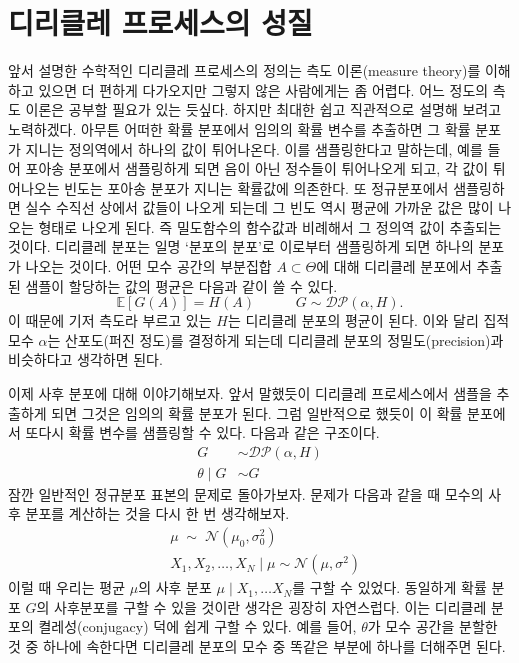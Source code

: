 \documentclass[a4paper, 10pt]{book}
\begin{document}
\section{디리클레 프로세스의 성질}
  앞서 설명한 수학적인 디리클레 프로세스의 정의는 측도 이론(measure theory)를 이해하고 있으면 더 편하게 다가오지만 그렇지 않은 사람에게는 좀 어렵다. 어느 정도의 측도 이론은 공부할 필요가 있는 듯싶다. 하지만 최대한 쉽고 직관적으로 설명해 보려고 노력하겠다. 아무튼 어떠한 확률 분포에서 임의의 확률 변수를 추출하면 그 확률 분포가 지니는 정의역에서 하나의 값이 튀어나온다. 이를 샘플링한다고 말하는데, 예를 들어 포아송 분포에서 샘플링하게 되면 음이 아닌 정수들이 튀어나오게 되고, 각 값이 튀어나오는 빈도는 포아송 분포가 지니는 확률값에 의존한다. 또 정규분포에서 샘플링하면 실수 수직선 상에서 값들이 나오게 되는데 그 빈도 역시 평균에 가까운 값은 많이 나오는 형태로 나오게 된다. 즉 밀도함수의 함수값과 비례해서 그 정의역 값이 추출되는 것이다. 디리클레 분포는 일명 `분포의 분포'로 이로부터 샘플링하게 되면 하나의 분포가 나오는 것이다. 어떤 모수 공간의 부분집합 $A \subset \Theta$에 대해 디리클레 분포에서 추출된 샘플이 할당하는 값의 평균은 다음과 같이 쓸 수 있다.
  $$
  \mathbb{E}\left[G\left(A\right)\right]=H\left(A\right) \hspace{35pt} G\sim \mathcal{DP}\left(\alpha, H\right).
  $$
  이 때문에 기저 측도라 부르고 있는 $H$는 디리클레 분포의 평균이 된다. 이와 달리 집적 모수 $\alpha$는 산포도(퍼진 정도)를 결정하게 되는데 디리클레 분포의 정밀도(precision)과 비슷하다고 생각하면 된다. \par
  이제 사후 분포에 대해 이야기해보자. 앞서 말했듯이 디리클레 프로세스에서 샘플을 추출하게 되면 그것은 임의의 확률 분포가 된다. 그럼 일반적으로 했듯이 이 확률 분포에서 또다시 확률 변수를 샘플링할 수 있다. 다음과 같은 구조이다.
  \begin{align*}
    G &\sim \mathcal{DP}\left(\alpha, H\right)\\
    \theta\;|\; G &\sim G
  \end{align*}
  잠깐 일반적인 정규분포 표본의 문제로 돌아가보자. 문제가 다음과 같을 때 모수의 사후 분포를 계산하는 것을 다시 한 번 생각해보자.
  \begin{align*}
    &\mu \;\sim\; \mathcal{N}\left(\mu_{0},\sigma_{0}^{2}\right)\\
    &X_{1},X_{2},\ldots , X_{N}\;|\;\mu \sim \mathcal{N}\left(\mu,\sigma^{2}\right)
  \end{align*}
  이럴 때 우리는 평균 $\mu$의 사후 분포 $\mu\;|\;X_{1},\ldots X_{N}$를 구할 수 있었다. 동일하게 확률 분포 $G$의 사후분포를 구할 수 있을 것이란 생각은 굉장히 자연스럽다. 이는 디리클레 분포의 켤레성(conjugacy) 덕에 쉽게 구할 수 있다. 예를 들어, $\theta$가 모수 공간을 분할한 것 중 하나에 속한다면 디리클레 분포의 모수 중 똑같은 부분에 하나를 더해주면 된다.
\end{document}
